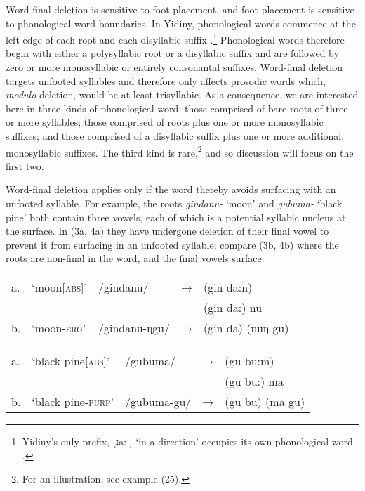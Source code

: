 \documentclass[output=paper,
modfonts
]{LSP/langsci}
\begin{document}
Word-final deletion is sensitive to foot placement, and foot placement is sensitive to phonological word boundaries. In Yidiny, phonological words commence at the left edge of each root and each disyllabic suffix \citep[88-98]{dixon1977a}.\footnote{Yidiny's only prefix, [ɟa:-] `in a direction' occupies its own phonological word \citep[98,162]{dixon1977a}.} Phonological words therefore begin with either a polysyllabic root or a disyllabic suffix and are followed by zero or more monosyllabic or entirely consonantal suffixes. Word-final deletion targets unfooted syllables and therefore only affects prosodic words which, \textit{modulo} deletion, would be at least trisyllabic. As a consequence, we are interested here in three kinds of phonological word: those comprised of bare roots of three or more syllables; those comprised of roots plus one or more monosyllabic suffixes; and those comprised of a disyllabic suffix plus one or more additional, monosyllabic suffixes. The third kind is rare,\footnote{For an illustration, see example (25).} and so discussion will focus on the first two. 

Word-final deletion applies only if the word thereby avoids surfacing with an unfooted syllable. For example, the roots \textit{gindanu-} `moon' and \textit{gubuma-} `black pine' both contain three vowels, each of which is a potential syllabic nucleus at the surface. In (3a, 4a) they have undergone deletion of their final vowel to prevent it from surfacing in an unfooted syllable; compare (3b, 4b) where the roots are non-final in the word, and the final vowels surface. 

\ea
\begin{tabular}[t]{@{}lllll}
a. & `moon\textsc{[abs]}' & /gindanu/  & → & (gin da:n) \\

&&&& \ljudge{*}(gin da:) nu \\
b. & `moon\textsc{-erg}' & /gindanu-ŋgu/  & → & (gin da) (nuŋ gu) \\
\end{tabular}

\ex 
\begin{tabular}[t]{@{}lllll}
a. &  `black pine[\textsc{abs}]' & /gubuma/  & → & (gu bu:m) \\
&&&& \ljudge{*}(gu bu:) ma \\
b. & `black pine\textsc{-purp}' & /gubuma-gu/  & → & (gu bu) (ma gu) \\
\end{tabular}
\z
\end{document}
